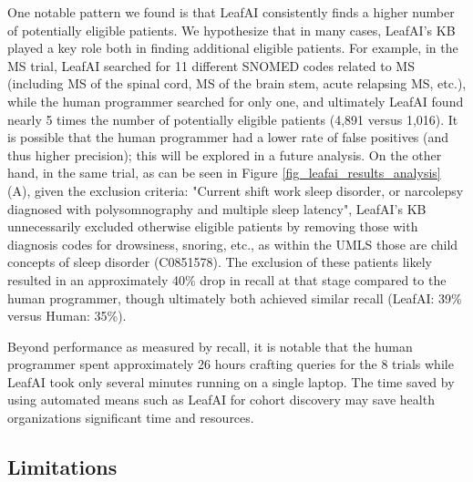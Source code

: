 \documentclass[../main.tex]{subfiles}
\begin{document}
One notable pattern we found is that LeafAI consistently finds a higher number of potentially eligible patients. We hypothesize that in many cases, LeafAI’s KB played a key role both in finding additional eligible patients. For example, in the MS trial, LeafAI searched for 11 different SNOMED codes related to MS (including MS of the spinal cord, MS of the brain stem, acute relapsing MS, etc.), while the human programmer searched for only one, and ultimately LeafAI found nearly 5 times the number of potentially eligible patients (4,891 versus 1,016). It is possible that the human programmer had a lower rate of false positives (and thus higher precision); this will be explored in a future analysis.  On the other hand, in the same trial, as can be seen in Figure \ref{fig_leafai_results_analysis} (A), given the exclusion criteria: "Current shift work sleep disorder, or narcolepsy diagnosed with polysomnography and multiple sleep latency", LeafAI’s KB unnecessarily excluded otherwise eligible patients by removing those with diagnosis codes for drowsiness, snoring, etc., as within the UMLS those are child concepts of sleep disorder (C0851578). The exclusion of these patients likely resulted in an approximately 40\% drop in recall at that stage compared to the human programmer, though ultimately both achieved similar recall (LeafAI: 39\% versus Human: 35\%).

Beyond performance as measured by recall, it is notable that the human programmer spent approximately 26 hours crafting queries for the 8 trials while LeafAI took only several minutes running on a single laptop. The time saved by using automated means such as LeafAI for cohort discovery may save health organizations significant time and resources.

\subsection*{Limitations}
\end{document}
